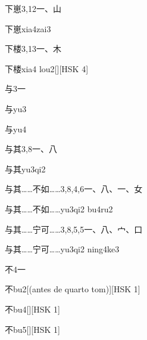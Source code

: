 \begin{entry}{下崽}{3,12}{⼀、⼭}
  \begin{phonetics}{下崽}{xia4zai3}
  \end{phonetics}
\end{entry}

\begin{entry}{下楼}{3,13}{⼀、⽊}
  \begin{phonetics}{下楼}{xia4 lou2}[][HSK 4]
  \end{phonetics}
\end{entry}

\begin{entry}{与}{3}{⼀}
  \begin{phonetics}{与}{yu3}
  \end{phonetics}
  \begin{phonetics}{与}{yu4}
  \end{phonetics}
\end{entry}

\begin{entry}{与其}{3,8}{⼀、⼋}
  \begin{phonetics}{与其}{yu3qi2}
  \end{phonetics}
\end{entry}

\begin{entry}{与其……不如……}{3,8,4,6}{⼀、⼋、⼀、⼥}
  \begin{phonetics}{与其……不如……}{yu3qi2 bu4ru2}
  \end{phonetics}
\end{entry}

\begin{entry}{与其……宁可……}{3,8,5,5}{⼀、⼋、⼧、⼝}
  \begin{phonetics}{与其……宁可……}{yu3qi2 ning4ke3}
  \end{phonetics}
\end{entry}

\begin{entry}{不}{4}{⼀}
  \begin{phonetics}{不}{bu2}[(antes de quarto tom)][HSK 1]
  \end{phonetics}
  \begin{phonetics}{不}{bu4}[][HSK 1]
  \end{phonetics}
  \begin{phonetics}{不}{bu5}[][HSK 1]
  \end{phonetics}
\end{entry}


